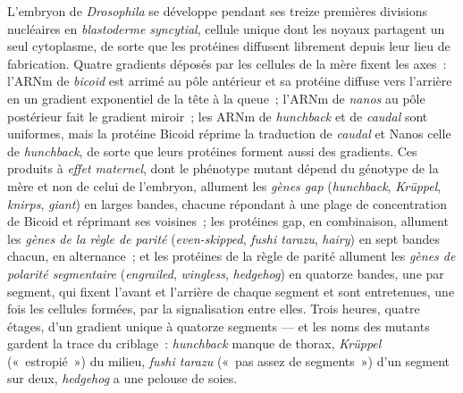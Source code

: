 \begin{definition}\label{def:b3:developmental-genetics:hierarchy}
L'embryon de \emph{Drosophila} se développe pendant ses treize premières
divisions nucléaires en \emph{blastoderme syncytial}, cellule unique
dont les noyaux partagent un seul cytoplasme, de sorte que les protéines
diffusent librement depuis leur lieu de fabrication. Quatre gradients
déposés par les cellules de la mère fixent les axes~: l'ARNm de
\emph{bicoid} est arrimé au pôle antérieur et sa protéine diffuse vers
l'arrière en un gradient exponentiel de la tête à la queue~; l'ARNm de
\emph{nanos} au pôle postérieur fait le gradient miroir~; les ARNm de
\emph{hunchback} et de \emph{caudal} sont uniformes, mais la protéine
Bicoid réprime la traduction de \emph{caudal} et Nanos celle de
\emph{hunchback}, de sorte que leurs protéines forment aussi des
gradients. Ces produits à \emph{effet maternel}, dont le phénotype
mutant dépend du génotype de la mère et non de celui de l'embryon,
allument les \emph{gènes gap} (\emph{hunchback}, \emph{Krüppel},
\emph{knirps}, \emph{giant}) en larges bandes, chacune répondant à une
plage de concentration de Bicoid et réprimant ses voisines~; les
protéines gap, en combinaison, allument les \emph{gènes de la règle de
parité} (\emph{even-skipped}, \emph{fushi tarazu}, \emph{hairy}) en sept
bandes chacun, en alternance~; et les protéines de la règle de parité
allument les \emph{gènes de polarité segmentaire} (\emph{engrailed},
\emph{wingless}, \emph{hedgehog}) en quatorze bandes, une par segment,
qui fixent l'avant et l'arrière de chaque segment et sont entretenues,
une fois les cellules formées, par la signalisation entre elles. Trois
heures, quatre étages, d'un gradient unique à quatorze segments --- et
les noms des mutants gardent la trace du criblage~: \emph{hunchback}
manque de thorax, \emph{Krüppel} («~estropié~») du milieu, \emph{fushi
tarazu} («~pas assez de segments~») d'un segment sur deux,
\emph{hedgehog} a une pelouse de soies.
\end{definition}

